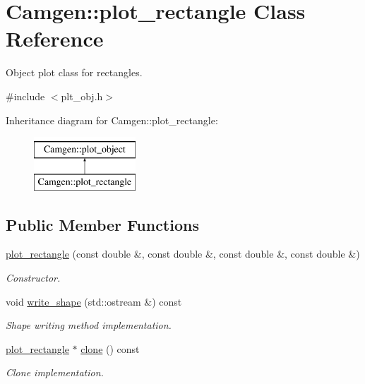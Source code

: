 \hypertarget{a00430}{}\section{Camgen\+:\+:plot\+\_\+rectangle Class Reference}
\label{a00430}


Object plot class for rectangles.  




{\ttfamily \#include $<$plt\+\_\+obj.\+h$>$}

Inheritance diagram for Camgen\+:\+:plot\+\_\+rectangle\+:\begin{figure}[H]
\begin{center}
\leavevmode
\includegraphics[height=2.000000cm]{a00430}
\end{center}
\end{figure}
\subsection*{Public Member Functions}
\begin{DoxyCompactItemize}
\item 
\hypertarget{a00430_a56b4c84ca0e11210e4cf3bad7e22f050}{}\hyperlink{a00430_a56b4c84ca0e11210e4cf3bad7e22f050}{plot\+\_\+rectangle} (const double \&, const double \&, const double \&, const double \&)\label{a00430_a56b4c84ca0e11210e4cf3bad7e22f050}

\begin{DoxyCompactList}\small\item\em Constructor. \end{DoxyCompactList}\item 
\hypertarget{a00430_a411bbec508761cba564ea6a5a4cd376a}{}void \hyperlink{a00430_a411bbec508761cba564ea6a5a4cd376a}{write\+\_\+shape} (std\+::ostream \&) const \label{a00430_a411bbec508761cba564ea6a5a4cd376a}

\begin{DoxyCompactList}\small\item\em Shape writing method implementation. \end{DoxyCompactList}\item 
\hypertarget{a00430_a828a04953b60d16b124d6654d8b2164a}{}\hyperlink{a00430}{plot\+\_\+rectangle} $\ast$ \hyperlink{a00430_a828a04953b60d16b124d6654d8b2164a}{clone} () const \label{a00430_a828a04953b60d16b124d6654d8b2164a}

\begin{DoxyCompactList}\small\item\em Clone implementation. \end{DoxyCompactList}\end{DoxyCompactItemize}
